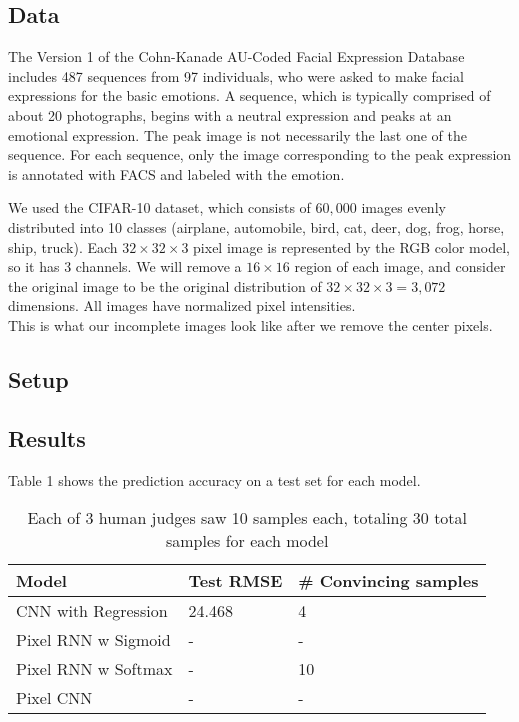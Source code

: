 \documentclass[10pt,twocolumn,letterpaper]{article}
\begin{document}
\subsection{Data}
The Version 1 of the Cohn-Kanade AU-Coded Facial Expression Database \cite{ck} includes 487 sequences from 97 individuals, who were asked to make facial expressions for the basic emotions. A sequence, which is typically comprised of about 20 photographs, begins with a neutral expression and peaks at an emotional expression. The peak image is not necessarily the last one of the sequence. For each sequence, only the image corresponding to the peak expression is annotated with FACS and labeled with the emotion.


We used the CIFAR-10 dataset, which consists of $60,000$ images evenly distributed into 10 classes (airplane, automobile, bird, cat, deer, dog, frog, horse, ship, truck). Each $32 \times 32 \times 3$ pixel image is represented by the RGB color model, so it has 3 channels. We will remove a $16 \times 16$ region of each image, and consider the original image to be the original distribution of $32 \times 32 \times 3 = 3,072$ dimensions. All images have normalized pixel intensities. \\

This is what our incomplete images look like after we remove the center pixels.\\



\subsection{Setup}

\subsection{Results}
Table 1 shows the prediction accuracy on a test set for each model.
\begin{table}[!ht]
\centering
\caption{Each of 3 human judges saw 10 samples each, totaling 30 total samples for each model}
\begin{tabular}{lll}
\hline
Model               & Test RMSE & \# Convincing samples \\ \hline
CNN with Regression & 24.468    &  4                     \\
Pixel RNN w Sigmoid &   -       &  -                     \\
Pixel RNN w Softmax &   -       &  10                     \\
Pixel CNN           &   -       &  -                     \\ \hline
\end{tabular}
\end{table}
\end{document}
